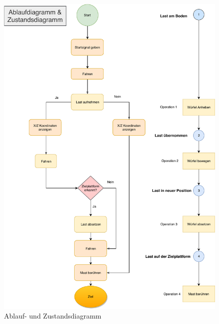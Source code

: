 \documentclass[a4paper]{report}
\begin{document}
\begin{figure}[h!]
	\includegraphics[keepaspectratio,width=\textwidth]{Ablaufdiagramm}
	\caption{Ablauf- und Zustandsdiagramm}
	\label{fig:Ablaufdiagramm}
\end{figure}

\newpage
\end{document}
